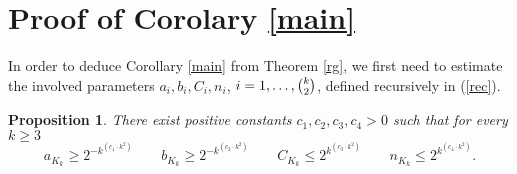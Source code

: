 \documentclass[reqno, 12pt]{amsart}
\newtheorem{prop}[theorem]{Proposition}
\begin{document}
\section{Proof of Corolary \ref{main}}\label{proofcor}




In order to deduce Corollary \ref{main} from Theorem \ref{rg}, we first need to estimate the involved parameters
$a_i,b_i,C_i,n_i$, $i=1,\dots,\tbinom k2$, defined  recursively in (\ref{rec}).

\begin{prop}\label{e^e}
There exist positive constants $c_1,c_2,c_3,c_4>0$ such that for every $k\ge3$
$$a_{K_k}\ge 2^{-k^{(c_1\cdot k^2)}}\qquad b_{K_k}\ge 2^{-k^{(c_2\cdot k^2)}}\qquad C_{K_k}\le
2^{k^{(c_3\cdot k^2)}}\qquad n_{K_k}\le 2^{k^{(c_4\cdot k^2)}}.$$
\end{prop}
\end{document}
